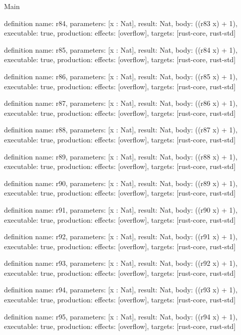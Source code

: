 \begin{lexlean}{Main}
\begin{semanticmodule}
definition{
  name: r84,
  parameters: [x : Nat],
  result: Nat,
  body: ((r83 x) + 1),
  executable: true,
  production: {effects: [overflow], targets: [rust-core, rust-std]}
}

definition{
  name: r85,
  parameters: [x : Nat],
  result: Nat,
  body: ((r84 x) + 1),
  executable: true,
  production: {effects: [overflow], targets: [rust-core, rust-std]}
}

definition{
  name: r86,
  parameters: [x : Nat],
  result: Nat,
  body: ((r85 x) + 1),
  executable: true,
  production: {effects: [overflow], targets: [rust-core, rust-std]}
}

definition{
  name: r87,
  parameters: [x : Nat],
  result: Nat,
  body: ((r86 x) + 1),
  executable: true,
  production: {effects: [overflow], targets: [rust-core, rust-std]}
}

definition{
  name: r88,
  parameters: [x : Nat],
  result: Nat,
  body: ((r87 x) + 1),
  executable: true,
  production: {effects: [overflow], targets: [rust-core, rust-std]}
}

definition{
  name: r89,
  parameters: [x : Nat],
  result: Nat,
  body: ((r88 x) + 1),
  executable: true,
  production: {effects: [overflow], targets: [rust-core, rust-std]}
}

definition{
  name: r90,
  parameters: [x : Nat],
  result: Nat,
  body: ((r89 x) + 1),
  executable: true,
  production: {effects: [overflow], targets: [rust-core, rust-std]}
}

definition{
  name: r91,
  parameters: [x : Nat],
  result: Nat,
  body: ((r90 x) + 1),
  executable: true,
  production: {effects: [overflow], targets: [rust-core, rust-std]}
}

definition{
  name: r92,
  parameters: [x : Nat],
  result: Nat,
  body: ((r91 x) + 1),
  executable: true,
  production: {effects: [overflow], targets: [rust-core, rust-std]}
}

definition{
  name: r93,
  parameters: [x : Nat],
  result: Nat,
  body: ((r92 x) + 1),
  executable: true,
  production: {effects: [overflow], targets: [rust-core, rust-std]}
}

definition{
  name: r94,
  parameters: [x : Nat],
  result: Nat,
  body: ((r93 x) + 1),
  executable: true,
  production: {effects: [overflow], targets: [rust-core, rust-std]}
}

definition{
  name: r95,
  parameters: [x : Nat],
  result: Nat,
  body: ((r94 x) + 1),
  executable: true,
  production: {effects: [overflow], targets: [rust-core, rust-std]}
}


\end{semanticmodule}
\end{lexlean}
